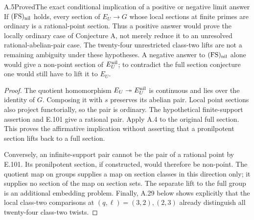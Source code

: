 \begin{result}{A.5}{Proved}{The exact conditional implication of a positive or negative limit answer}
If \((\mathrm{FS})_{\rm nil}\) holds, every section of \(E_U\to G\)
whose local sections at finite primes are ordinary is a rational-point
section. Thus a positive answer would prove the locally ordinary case of
Conjecture A, not merely reduce it to an unresolved rational-abelian-pair
case. The twenty-four unrestricted class-two lifts are not a remaining
ambiguity under these hypotheses. A negative answer to
\((\mathrm{FS})_{\rm nil}\) alone would give a non-point section of
\(E_U^{\rm nil}\); to contradict the full section conjecture one would
still have to lift it to \(E_U\).
\end{result}
\begin{proof}
The quotient homomorphism \(E_U\twoheadrightarrow E_U^{\rm nil}\)
is continuous and lies over the identity of \(G\). Composing it with
\(s\) preserves its abelian pair. Local point sections also project
functorially, so the pair is ordinary. The hypothetical finite-support
assertion and E.101 give a rational pair. Apply A.4 to the original
full section. This proves the affirmative implication without asserting
that a pronilpotent section lifts back to a full section.

Conversely, an infinite-support pair cannot be the pair of a rational
point by E.101. Its pronilpotent section, if constructed, would therefore
be non-point. The quotient map on groups supplies a map on section
classes in this direction only; it supplies no section of the map on
section sets. The separate lift to the full group is an additional
embedding problem. Finally, A.29 below shows explicitly that the local
class-two comparisons at \((q,\ell)=(3,2),(2,3)\) already distinguish
all twenty-four class-two twists.
\end{proof}

